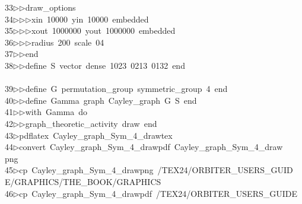 \begin{tabbing}
33\>$\triangleright$\>$\triangleright$\>draw\_options\ \\[0pt]
34\>$\triangleright$\>$\triangleright$\>$\triangleright$\>xin\ 10000\ yin\ 10000\ embedded\ \\[0pt]
35\>$\triangleright$\>$\triangleright$\>$\triangleright$\>xout\ 1000000\ yout\ 1000000\ embedded\ \\[0pt]
36\>$\triangleright$\>$\triangleright$\>$\triangleright$\>radius\ 200\ scale\ 04\ \\[0pt]
37\>$\triangleright$\>$\triangleright$\>end\ \\[0pt]
38\>$\triangleright$\>$\triangleright$\>define\ S\ vector\ dense\ 1023\ 0213\ 0132\ end\\[0pt]
\>\ \\[0pt]
39\>$\triangleright$\>$\triangleright$\>define\ G\ permutation\_group\ symmetric\_group\ 4\ end\ \\[0pt]
40\>$\triangleright$\>$\triangleright$\>define\ Gamma\ graph\ Cayley\_graph\ G\ S\ end\ \\[0pt]
41\>$\triangleright$\>$\triangleright$\>with\ Gamma\ do\ \\[0pt]
42\>$\triangleright$\>$\triangleright$\>graph\_theoretic\_activity\ draw\ end\\[0pt]
43\>$\triangleright$\>pdflatex\ Cayley\_graph\_Sym\_4\_drawtex\\[0pt]
44\>$\triangleright$\>convert\ Cayley\_graph\_Sym\_4\_drawpdf\ Cayley\_graph\_Sym\_4\_draw\\[0pt]
\>png\\[0pt]
45\>$\triangleright$\>cp\ Cayley\_graph\_Sym\_4\_drawpng\ /TEX24/ORBITER\_USERS\_GUID\\[0pt]
\>E/GRAPHICS/THE\_BOOK/GRAPHICS\\[0pt]
46\>$\triangleright$\>cp\ Cayley\_graph\_Sym\_4\_drawpdf\ /TEX24/ORBITER\_USERS\_GUIDE\\[0pt]

\end{tabbing}
